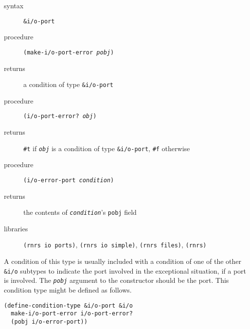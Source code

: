 \begin{description}

\label{exceptions_s41}\item[syntax] \texttt{\&{}i/o-port}



\item[procedure] \texttt{(make-i/o-port-error \textit{pobj})}



\item[returns] a condition of type \texttt{\&{}i/o-port}


\item[procedure] \texttt{(i/o-port-error? \textit{obj})}



\item[returns] \texttt{\#{}t} if \texttt{\textit{obj}} is a condition of type \texttt{\&{}i/o-port}, \texttt{\#{}f} otherwise


\item[procedure] \texttt{(i/o-error-port \textit{condition})}



\item[returns] the contents of \texttt{\textit{condition}}'s \texttt{pobj} field


\item[libraries] \texttt{(rnrs io ports)}, \texttt{(rnrs io simple)}, \texttt{(rnrs files)}, \texttt{(rnrs)}
\end{description}



A condition of this type is usually included with a condition of one of the other \texttt{\&{}i/o}
subtypes to indicate the port involved in the exceptional situation, if a port
is involved.
The \texttt{\textit{pobj}} argument to the constructor should be the port.
This condition type might be defined as follows.

\begin{alltt}
(define-condition-type \&{}i/o-port \&{}i/o
  make-i/o-port-error i/o-port-error?
  (pobj i/o-error-port))
\end{alltt}

